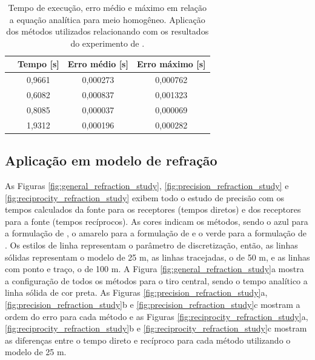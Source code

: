 \begin{table}[H]
	\caption{Tempo de execução, erro médio e máximo em relação a equação analítica para meio homogêneo. Aplicação dos métodos utilizados relacionando com os resultados do experimento de .}
	\begin{tabular}{r|ccc}
		\multicolumn{1}{c|}{} & Tempo {[}s{]} & Erro médio {[}s{]} & Erro máximo {[}s{]} \\ \hline
		\citeonline{podvin1991finite} & 0,9661        & 0,000273           & 0,000762            \\ \hline
		\citeonline{jeong2008fast}    & 0,6082        & 0,000837           & 0,001323            \\ \hline
		\citeonline{noble2014accurate}& 0,8085        & 0,000037           & 0,000069            \\ \hline
		\citeonline{cai2023improved}  & 1,9312        & 0,000196           & 0,000282           
	\end{tabular}
	\label{table_homog}
\end{table}

\subsection{Aplicação em modelo de refração}

As Figuras \ref{fig:general_refraction_study}, \ref{fig:precision_refraction_study} e \ref{fig:reciprocity_refraction_study} exibem todo o estudo de precisão com os tempos calculados da fonte para os receptores (tempos diretos) e dos receptores para a fonte (tempos recíprocos). As cores indicam os métodos, sendo o azul para a formulação de , o amarelo para a formulação de  e o verde para a formulação de . Os estilos de linha representam o parâmetro de discretização, então, as linhas sólidas representam o modelo de 25 m, as linhas tracejadas, o de 50 m, e as linhas com ponto e traço, o de 100 m. A Figura \ref{fig:general_refraction_study}a mostra a configuração de todos os métodos para o tiro central, sendo o tempo analítico a linha sólida de cor preta. As Figuras \ref{fig:precision_refraction_study}a, \ref{fig:precision_refraction_study}b e \ref{fig:precision_refraction_study}c mostram a ordem do erro para cada método e as Figuras \ref{fig:reciprocity_refraction_study}a, \ref{fig:reciprocity_refraction_study}b e \ref{fig:reciprocity_refraction_study}c mostram as diferenças entre o tempo direto e recíproco para cada método utilizando o modelo de 25 m.  

